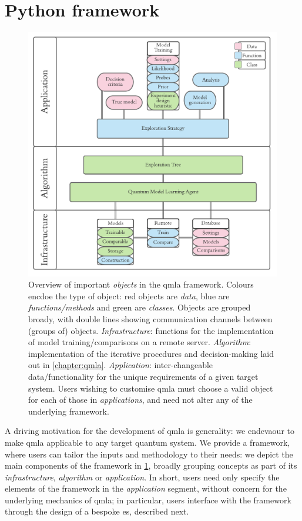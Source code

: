 \section{Python framework}
\begin{figure}
    \includegraphics{algorithms/software_overview.pdf}
    \caption[ \gls{qmla} codebase overview]{
        Overview of important \emph{objects} in the \gls{qmla} framework.
        Colours encdoe the type of object: red objects are \emph{data}, blue are \emph{functions/methods} 
        and green are \emph{classes}. 
        Objects are grouped broady, with double lines showing communication channels between (groups of) objects. 
        \emph{Infrastructure}: functions for the implementation of model training/comparisons on 
        a remote server.
        \emph{Algorithm}: implementation of the iterative procedures and decision-making 
        laid out in \cref{chapter:qmla}. 
        \emph{Application}: inter-changeable data/functionality for the unique requirements 
        of a given target system. 
        Users wishing to customise \gls{qmla} must choose a valid object for each of those in \emph{applications}, 
            and need not alter any of the underlying framework.
    }
    \label{fig:software_overview}
\end{figure}

A driving motivation for the development of \gls{qmla} is generality:
    we endevaour to make \gls{qmla} applicable to any target quantum system.
We provide a framework, where users can tailor the inputs and methodology to their needs:
    we depict the main components of the framework in \cref{fig:software_overview}, 
    broadly grouping concepts as part of its \emph{infrastructure}, \emph{algorithm}
    or \emph{application}. 
In short, users need only specify the elements of the framework in the \emph{application} segment, 
    without concern for the underlying mechanics of \gls{qmla}; 
    in particular, users interface with the framework through the design of a bespoke \gls{es}, described next. 


